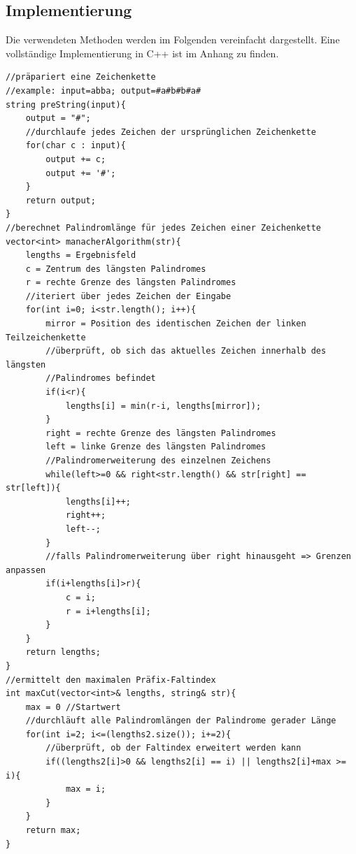 \subsection{Implementierung}
\label{subsec:TextBefehle}
Die verwendeten Methoden werden im Folgenden vereinfacht dargestellt. Eine vollständige Implementierung in C++ ist im Anhang zu finden.
\begin{lstlisting}
//präpariert eine Zeichenkette
//example: input=abba; output=#a#b#b#a#
string preString(input){
    output = "#";
    //durchlaufe jedes Zeichen der ursprünglichen Zeichenkette    
    for(char c : input){
        output += c;
        output += '#';
    }    
    return output;
}
//berechnet Palindromlänge für jedes Zeichen einer Zeichenkette
vector<int> manacherAlgorithm(str){
    lengths = Ergebnisfeld
    c = Zentrum des längsten Palindromes
    r = rechte Grenze des längsten Palindromes
    //iteriert über jedes Zeichen der Eingabe
    for(int i=0; i<str.length(); i++){ 
        mirror = Position des identischen Zeichen der linken Teilzeichenkette
        //überprüft, ob sich das aktuelles Zeichen innerhalb des längsten 
        //Palindromes befindet
        if(i<r){
            lengths[i] = min(r-i, lengths[mirror]);
        }
        right = rechte Grenze des längsten Palindromes
        left = linke Grenze des längsten Palindromes
        //Palindromerweiterung des einzelnen Zeichens
        while(left>=0 && right<str.length() && str[right] == str[left]){
            lengths[i]++;
            right++;
            left--;
        }
        //falls Palindromerweiterung über right hinausgeht => Grenzen anpassen
        if(i+lengths[i]>r){
            c = i;
            r = i+lengths[i];
        }
    }
    return lengths;
}
//ermittelt den maximalen Präfix-Faltindex
int maxCut(vector<int>& lengths, string& str){
    max = 0 //Startwert
    //durchläuft alle Palindromlängen der Palindrome gerader Länge
    for(int i=2; i<=(lengths2.size()); i+=2){ 
        //überprüft, ob der Faltindex erweitert werden kann
        if((lengths2[i]>0 && lengths2[i] == i) || lengths2[i]+max >= i){
            max = i;
        }
    }
    return max;
}
\end{lstlisting}
%
